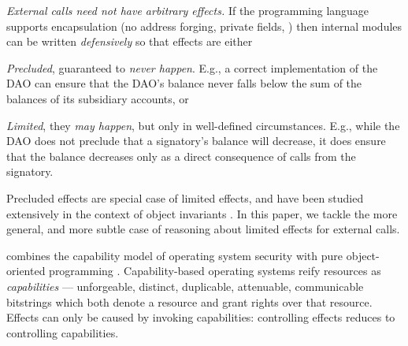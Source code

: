  
 {\em{External calls  need not have  arbitrary   effects.}}
If the programming language supports encapsulation (\eg no address forging, private
 fields, %
 \etc) then internal modules can be  written \emph{defensively} %
so  that effects are either

 \begin{customquote}
\emph{Precluded}, \ie  guaranteed to \emph{never happen}.
  E.g., a  correct  %
 implementation of the DAO  \cite{Dao} can ensure that  
 the DAO's balance  never falls below the sum of the balances of its subsidiary accounts, or


 \emph{Limited}, \ie  they  \emph{may happen}, but
 only in well-defined circumstances.
E.g., while the DAO does not preclude that a signatory's balance will decrease, it  does ensure that the balance decreases only
as a direct consequence of calls from the signatory.
 
 \end{customquote}
 
 \vspace{.1cm}
 
\noindent
Precluded effects are special case of limited effects,
and have been studied extensively in the context of object invariants   \cite{staticsfull,DrossoFrancaMuellerSummers08,BarDelFahLeiSch04,objInvars,MuellerPoetzsch-HeffterLeavens06}.
In this paper, we tackle the more general, %
and more subtle case of reasoning about limited effects for external calls.
 

\newcommand{\paragraphsd}[1]{\vspace{.05cm}{\textit{#1}}}
 
 
\paragraphsd{The Object Capability Model}
combines the capability model
of operating system security \cite{levy:capabilities,CAP}
with pure object-oriented programming
\cite{selfpower,selfexp95,agha_actors_1987}.  Capability-based
operating systems reify resources
as \textit{capabilities} ---
unforgeable, distinct, duplicable, attenuable, communicable bitstrings
which both denote a resource and grant rights over that resource.
Effects can only be caused by invoking capabilities:
controlling effects reduces to controlling capabilities.


